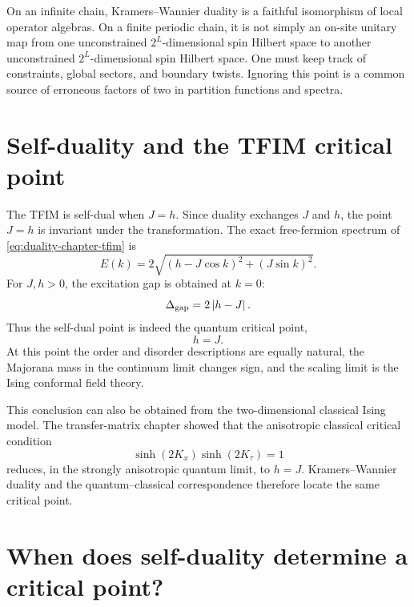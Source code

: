 \begin{remark}
On an infinite chain, Kramers--Wannier duality is a faithful isomorphism of local
operator algebras.  On a finite periodic chain, it is not simply an on-site
unitary map from one unconstrained $2^L$-dimensional spin Hilbert space to
another unconstrained $2^L$-dimensional spin Hilbert space.  One must keep track
of constraints, global sectors, and boundary twists.  Ignoring this point is a
common source of erroneous factors of two in partition functions and spectra.
\end{remark}

\section{Self-duality and the TFIM critical point}
\label{sec:self-duality-tfim-critical-point}

The TFIM is self-dual when $J=h$.  Since duality exchanges $J$ and $h$, the point
$J=h$ is invariant under the transformation.  The exact free-fermion spectrum of
\cref{eq:duality-chapter-tfim} is
\begin{equation}
\label{eq:duality-tfim-spectrum}
    E(k)
    =
    2\sqrt{
        (h-J\cos k)^2
        +
        (J\sin k)^2
    }.
\end{equation}
For $J,h>0$, the excitation gap is obtained at $k=0$:
\begin{equation}
\label{eq:duality-tfim-gap}
    \Delta_{\rm gap}=2\left|h-J\right|.
\end{equation}
Thus the self-dual point is indeed the quantum critical point,
\begin{equation}
\label{eq:duality-tfim-critical-point}
    h=J .
\end{equation}
At this point the order and disorder descriptions are equally natural, the
Majorana mass in the continuum limit changes sign, and the scaling limit is the
Ising conformal field theory.

This conclusion can also be obtained from the two-dimensional classical Ising
model.  The transfer-matrix chapter showed that the anisotropic classical
critical condition
\begin{equation}
    \sinh(2K_x)\sinh(2K_\tau)=1
\end{equation}
reduces, in the strongly anisotropic quantum limit, to $h=J$.  Kramers--Wannier
duality and the quantum--classical correspondence therefore locate the same
critical point.

\section{When does self-duality determine a critical point?}
\label{sec:self-duality-criterion-limitations}


